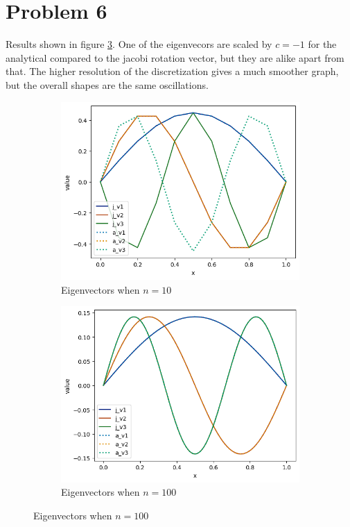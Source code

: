 \documentclass[final, 3p, times, 11.5pt]{article}
\begin{document}
\section{Problem 6}

Results shown in figure \ref{fig:p2prob6}. One of the eigenvecors are scaled by $c=-1$ for the analytical compared to the jacobi rotation vector, but they are alike apart from that. 
The higher resolution of the discretization gives a much smoother graph, but the overall shapes are the same oscillations.

\begin{figure}[h!]
     \centering
     \begin{subfigure}[b]{0.5\textwidth}
         \centering
         \includegraphics[width=\textwidth]{Project 2/Figures/eigenvectors.png}
         \caption{Eigenvectors when $n=10$}
         \label{fig:eigvec10}
     \end{subfigure}
     \hfill
     \begin{subfigure}[b]{0.5\textwidth}
         \centering
         \includegraphics[width=\textwidth]{Project 2/Figures/eigenvectors100.png}
         \caption{Eigenvectors when $n=100$}
         \label{fig:eigvec100}
     \end{subfigure}
     \label{fig:p2prob6}
\end{figure}
\end{document}
